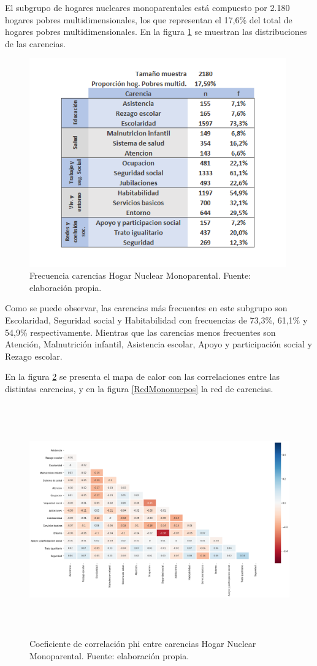 \documentclass[12pt,letterpaper,spanish]{article}
\begin{document}
El subgrupo de hogares nucleares monoparentales está compuesto por 2.180 hogares pobres multidimensionales, los que representan el 17,6\% del total de hogares pobres multidimensionales. En la figura \ref{freHMononuc} se muestran las distribuciones de las carencias.
\begin{figure}[H]
  \centering
    \includegraphics[height=9cm]{HOGARES/tabla_mononuc.png}
    \caption{Frecuencia carencias Hogar Nuclear Monoparental. Fuente: elaboración propia.}
    \label{freHMononuc}
\end{figure}
Como se puede observar, las carencias más frecuentes en este subgrupo son Escolaridad, Seguridad social y Habitabilidad con frecuencias de 73,3\%, 61,1\% y 54,9\% respectivamente. Mientras que las carencias menos frecuentes son Atención, Malnutrición infantil, Asistencia escolar, Apoyo y participación social y Rezago escolar.

En la figura \ref{HM_HMononuc} se presenta el mapa de calor con las correlaciones entre las distintas carencias, y en la figura \ref{RedMononucpos} la red de carencias.

\begin{figure}[H]
    \centering
    \includegraphics[height=10cm]{Heatmaps/Heatmap_pearson_car_monuc.png}
    \caption{Coeficiente de correlación phi entre carencias Hogar Nuclear Monoparental. Fuente: elaboración propia.}
    \label{HM_HMononuc}
\end{figure}
\end{document}
